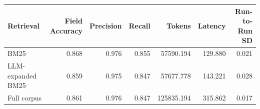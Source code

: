 \begin{tabular}{lrrrrrr}
\toprule
Retrieval & Field Accuracy & Precision & Recall & Tokens & Latency & Run-to-Run SD \\
\midrule
BM25 & 0.868 & 0.976 & 0.855 & 57590.194 & 129.880 & 0.021 \\
LLM-expanded BM25 & 0.859 & 0.975 & 0.847 & 57677.778 & 143.221 & 0.028 \\
Full corpus & 0.861 & 0.976 & 0.847 & 125835.194 & 315.862 & 0.017 \\
\bottomrule
\end{tabular}
